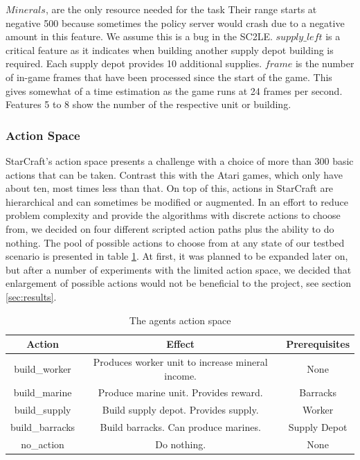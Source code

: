 \documentclass[12pt,a4paper]{article}
\begin{document}
$Minerals$, are the only resource needed for the task Their range starts at negative 500 because sometimes the policy server would crash due to a negative amount in this feature. We assume this is a bug in the SC2LE. $supply\_left$ is a critical feature as it indicates when building another supply depot building is required. Each supply depot provides 10 additional supplies. $frame$ is the number of in-game frames that have been processed since the start of the game. This gives somewhat of a time estimation as the game runs at 24 frames per second. Features 5 to 8 show the number of the respective unit or building.
\subsubsection{Action Space}\label{sec:action}
StarCraft's action space presents a challenge with a choice of more than 300 basic actions that can be taken. Contrast this with the Atari games, which only have about ten, most times less than that. On top of this, actions in StarCraft are hierarchical and can sometimes be modified or augmented.
In an effort to reduce problem complexity and provide the algorithms with discrete actions to choose from, we decided on four different scripted action paths plus the ability to do nothing. The pool of possible actions to choose from at any state of our testbed scenario is presented in table \ref{tab:actions}. At first, it was planned to be expanded later on, but after a number of experiments with the limited action space, we decided that enlargement of possible actions would not be beneficial to the project, see section \ref{sec:results}.
\begin{table}
    \begin{center}
        \begin{tabular}{ c | c | c }
            {\bf Action} & {\bf Effect} & {\bf Prerequisites} \\
            \hline
            build\_worker & Produces worker unit to increase mineral income. & None \\ 
            build\_marine & Produce marine unit. Provides reward. & Barracks \\  
            build\_supply & Build supply depot. Provides supply. & Worker \\
            build\_barracks & Build barracks. Can produce marines. & Supply Depot \\
            no\_action & Do nothing. & None    
        \end{tabular}
    \end{center}
    \caption{The agents action space}
    \label{tab:actions}
\end{table}
\end{document}
